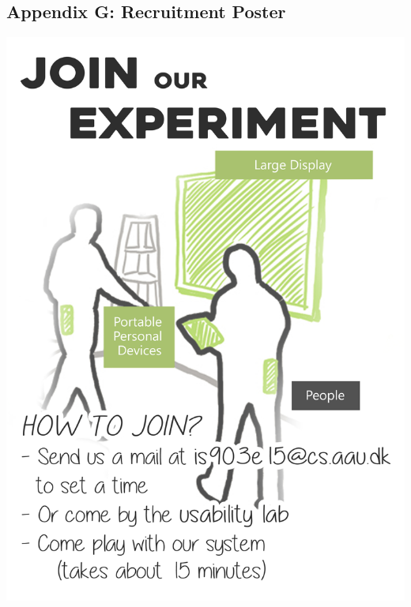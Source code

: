 \subsection*{Appendix G: Recruitment Poster}
\begin{adjustbox}{width=\textwidth}
	\includegraphics{appendix/images/poster.jpg}
\end{adjustbox}